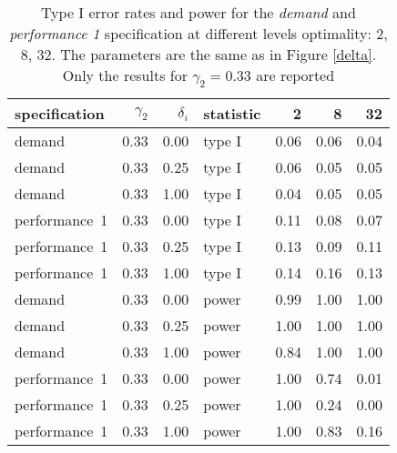 \begin{table}[ht]
\centering
\begingroup\footnotesize
\begin{tabular}{lrrlrrr}
  \hline
specification & $\gamma_2$ & $\delta_i$ & statistic & 2 & 8 & 32 \\ 
  \hline
demand & 0.33 & 0.00 & type I & 0.06 & 0.06 & 0.04 \\ 
  demand & 0.33 & 0.25 & type I & 0.06 & 0.05 & 0.05 \\ 
  demand & 0.33 & 1.00 & type I & 0.04 & 0.05 & 0.05 \\ 
  performance~1 & 0.33 & 0.00 & type I & 0.11 & 0.08 & 0.07 \\ 
  performance~1 & 0.33 & 0.25 & type I & 0.13 & 0.09 & 0.11 \\ 
  performance~1 & 0.33 & 1.00 & type I & 0.14 & 0.16 & 0.13 \\ 
  demand & 0.33 & 0.00 & power & 0.99 & 1.00 & 1.00 \\ 
  demand & 0.33 & 0.25 & power & 1.00 & 1.00 & 1.00 \\ 
  demand & 0.33 & 1.00 & power & 0.84 & 1.00 & 1.00 \\ 
  performance~1 & 0.33 & 0.00 & power & 1.00 & 0.74 & 0.01 \\ 
  performance~1 & 0.33 & 0.25 & power & 1.00 & 0.24 & 0.00 \\ 
  performance~1 & 0.33 & 1.00 & power & 1.00 & 0.83 & 0.16 \\ 
   \hline
\end{tabular}
\endgroup
\caption{Type I error rates and power for the \emph{demand} and
             \emph{performance 1} specification at different levels optimality: 
             2, 8, 32. The parameters are the same as in Figure \ref{delta}.
             Only the results for $\gamma_{2} = 0.33$ are reported} 
\label{delta-table}
\end{table}
